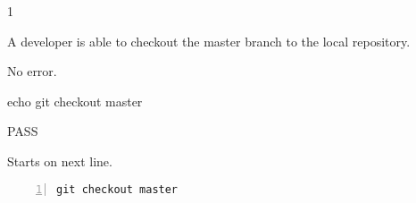 \begin{description}[align=right,leftmargin=3.2cm,labelindent=3.0cm]
\item[Step:] 1
\item[Confirm:] A developer is able to checkout the master branch to the local repository.
\item[Expectation:] No error.
\item[Command:] echo git  checkout master
\item[Test Result:] PASS
\item[Evidence:] Starts on next line.
\end{description}
\begin{lstlisting}[numbers=left]
git checkout master

\end{lstlisting}
